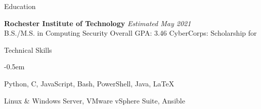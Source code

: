 \documentclass[8pt]{resume} %
\begin{document}

\begin{rSection}{Education}

{\bf Rochester Institute of Technology} \hfill {\em Estimated May 2021} \\ 
B.S./M.S. in Computing Security \hfill Overall GPA: 3.46
CyberCorps: Scholarship for

\end{rSection}


\begin{rSection}{Technical Skills}

    \begin{multicols}{2}[]

    \begin{description}
        \itemsep -0.5em
        \item[Languages] Python, C, JavaScript, Bash, PowerShell, Java, \LaTeX
        \item[Tools/Software] Linux \& Windows Server, VMware vSphere Suite,
            Ansible
    \end{description}

    \end{multicols}

\end{rSection}

\end{document}
